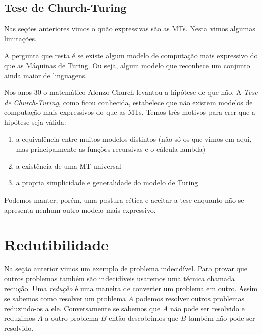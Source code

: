 \subsection{Tese de Church-Turing}

Nas seções anteriores vimos o quão expressivas são as MTs.
Nesta vimos algumas limitações.

A pergunta que resta é se existe algum modelo de computação mais expressivo do que as Máquinas de Turing.
Ou seja, algum modelo que reconhece um conjunto ainda maior de linguagens.

Nos anos 30 o matemático Alonzo Church levantou a hipótese de que não.
A {\em Tese de Church-Turing}, como ficou conhecida, estabelece que não existem modelos de computação mais expressivos do que as MTs.
Temos três motivos para crer que a hipótese seja válida:
\begin{enumerate}
\item a equivalência entre muitos modelos distintos (não só os que vimos em aqui, mas principalmente as funções recursivas e o cálcula lambda)
\item a existência de uma MT universal
\item a propria simplicidade e generalidade do modelo de Turing
\end{enumerate}

Podemos manter, porém, uma postura cética e aceitar a tese enquanto não se apresenta nenhum outro modelo mais expressivo.

\section{Redutibilidade}
\label{sec:redutibilidade}

Na seção anterior vimos um exemplo de problema indecidível.
Para provar que outros problemas também são indecidíveis usaremos uma técnica chamada redução.
Uma {\em redução} é uma maneira de converter um problema em outro.
Assim se sabemos como resolver um problema $A$ podemos resolver outros problemas reduzindo-os a ele.
Conversamente se sabemos que $A$ não pode ser resolvido e reduzimos $A$ a outro problema $B$ então descobrimos que $B$ também não pode ser resolvido.


